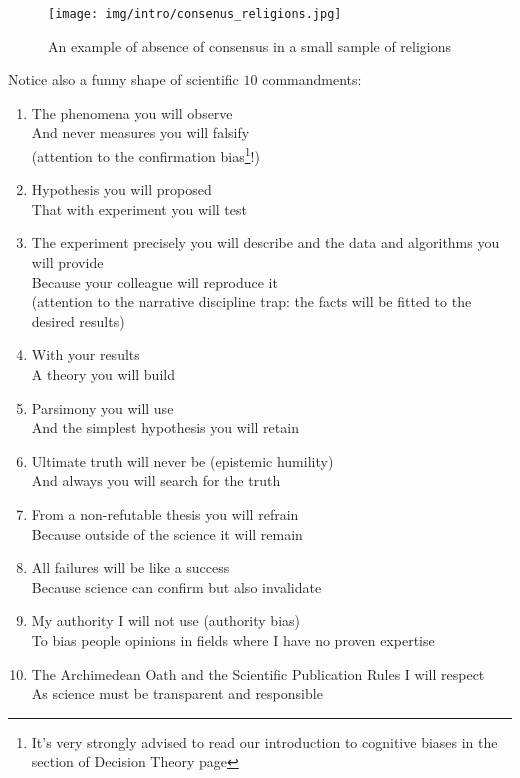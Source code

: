 	\begin{figure}[H]
		\centering
		\texttt{[image: img/intro/consenus\_religions.jpg]}
		\caption[]{An example of absence of consensus in a small sample of religions}
	\end{figure}
	Notice also a funny shape of scientific $10$ commandments:
	\begin{enumerate}
		\item The phenomena you will observe\\
		And never measures you will falsify\\
		(attention to the confirmation bias\footnote{It's very strongly advised to read our introduction to cognitive biases in the section of Decision Theory page \pageref{cognitive bias}}!)
		
		\item Hypothesis you will proposed\\
		That with experiment you will test
		
		\item The experiment precisely you will describe and the data and algorithms you will provide\\
		Because your colleague will reproduce it\\
		(attention to the narrative discipline trap: the facts will be fitted to the desired results)
		
		\item With your results\\
		A theory you will build
		
		\item Parsimony you will use\\
		And the simplest hypothesis you will retain
		
		\item Ultimate truth will never be (epistemic humility)\\
		And always you will search for the truth
		
		\item From a non-refutable thesis you will refrain\\
		Because outside of the science it will remain
		
		\item All failures will be like a success\\
		Because science can confirm but also invalidate
		
		\item My authority I will not use (authority bias)\\
		To bias people opinions in fields where I have no proven expertise
		
		\item The Archimedean Oath and the Scientific Publication Rules I will respect\\
		As science must be transparent and responsible
	\end{enumerate}
	
